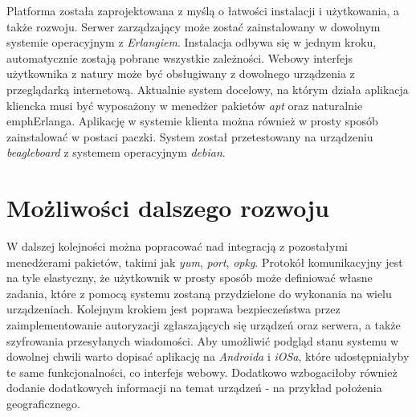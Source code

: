 \documentclass[polish,12pt]{aghthesis}
\begin{document}
Platforma została zaprojektowana z myślą o łatwości instalacji i użytkowania, a także rozwoju. Serwer zarządzający może zostać zainstalowany w dowolnym systemie operacyjnym z \emph{Erlangiem}. Instalacja odbywa się w jednym kroku, automatycznie zostają pobrane wszystkie zależności. Webowy interfejs użytkownika z natury może być obsługiwany z dowolnego urządzenia z przeglądarką internetową. Aktualnie system docelowy, na którym działa aplikacja kliencka musi być wyposażony w menedżer pakietów \emph{apt} oraz naturalnie emph{Erlanga}. Aplikację w systemie klienta można również w prosty sposób zainstalować w postaci paczki. System został przetestowany na urządzeniu \emph{beagleboard} z systemem operacyjnym \emph{debian}.

\section{Możliwości dalszego rozwoju}
W dalszej kolejności można popracować nad integracją z pozostałymi menedżerami pakietów, takimi jak \emph{yum}, \emph{port}, \emph{opkg}. Protokół komunikacyjny jest na tyle elastyczny, że użytkownik w prosty sposób może definiować własne zadania, które z pomocą systemu zostaną przydzielone do wykonania na wielu urządzeniach. Kolejnym krokiem jest poprawa bezpieczeństwa przez zaimplementowanie autoryzacji zgłaszających się urządzeń oraz serwera, a także szyfrowania przesyłanych wiadomości. Aby umożliwić podgląd stanu systemu w dowolnej chwili warto dopisać aplikację na \emph{Androida} i \emph{iOSa}, które udostępniałyby te same funkcjonalności, co interfejs webowy. Dodatkowo wzbogaciłoby również dodanie dodatkowych informacji na temat urządzeń - na przykład położenia geograficznego.
\end{document}
